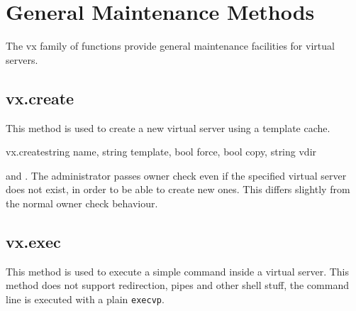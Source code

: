 \chapter{General Maintenance Methods}

The vx family of functions provide general maintenance facilities for virtual
servers.


\section{vx.create}

This method is used to create a new virtual server using a template cache.

\begin{rpcsynopsis}{vx.create}{string name, string template,
	bool force, bool copy, string vdir}
\end{rpcsynopsis}

\begin{rpcaccess}
 and \rpcownerchecks. The administrator passes owner
check even if the specified virtual server does not exist, in order to be able
to create new ones. This differs slightly from the normal owner check
behaviour.
\end{rpcaccess}

\rpcreturnnil

\begin{rpcerrors}
\end{rpcerrors}


\section{vx.exec}

This method is used to execute a simple command inside a virtual server. This
method does not support redirection, pipes and other shell stuff, the command
line is executed with a plain \texttt{execvp}.

